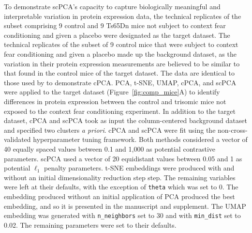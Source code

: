 \documentclass{article}
\begin{document}
To demonstrate scPCA's capacity to capture biologically meaningful and interpretable variation in protein expression data, the technical replicates of the subset comprising 9 control and 9 Ts65Dn mice not subject to context fear conditioning and given a placebo were designated as the target dataset. The technical replicates of the subset of 9 control mice that were subject to context fear conditioning and given a placebo made up the background dataset, as the variation in their protein expression measurements are believed to be similar to that found in the control mice of the target dataset. The data are identical to those used by \citet{Abid2018} to demonstrate cPCA. PCA, t-SNE, UMAP, cPCA, and scPCA were applied to the target dataset (Figure~\ref{fig:comp_mice}A) to identify differences in protein expression between the control and trisomic mice not exposed to the context fear conditioning experiment. In addition to the target dataset, cPCA and scPCA took as input the column-centered background dataset and specified two clusters \textit{a priori}. cPCA and scPCA were fit using the non-cross-validated hyperparameter tuning framework. Both methods considered a vector of 40 equally spaced values between 0.1 and 1,000 as potential contrastive parameters. scPCA used a vector of 20 equidistant values between 0.05 and 1 as potential $\ell_1$ penalty parameters. t-SNE embeddings were produced with and without an initial dimensionality reduction step step. The remaining variables were left at their defaults, with the exception of \texttt{theta} which was set to 0. The embedding produced without an initial application of PCA produced the best embedding, and so it is presented in the manuscript and supplement. The UMAP embedding was generated with \texttt{n\_neighbors} set to 30 and with \texttt{min\_dist} set to 0.02. The remaining parameters were set to their defaults.
\end{document}
